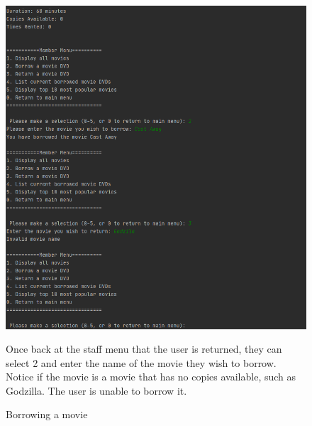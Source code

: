 \documentclass[a4paper,12pt]{article}
\begin{document}
\begin{figure}[!htb]
\centering
\includegraphics[width=1\textwidth]{8}
\caption{Borrowing a movie}
\medskip
\small
Once back at the staff menu that the user is returned, they can select 2 and enter the name of the movie they wish to borrow. Notice if the movie is a movie that has no copies available, such as Godzilla. The user is unable to borrow it.
\end{figure}
\end{document}
